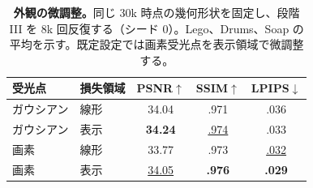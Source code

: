 \begin{table}[t]
\caption{\textbf{外観の微調整。}同じ 30k 時点の幾何形状を固定し、段階 III を 8k 回反復する（シード 0）。Lego、Drums、Soap の平均を示す。既定設定では画素受光点を表示領域で微調整する。}
\label{tab:refine}
\centering\small
\begin{tabular}{@{}llccc@{}}
\toprule
受光点 & 損失領域 & PSNR$\uparrow$ & SSIM$\uparrow$ & LPIPS$\downarrow$ \\
\midrule
ガウシアン & 線形 & 34.04 & .971 & .036 \\
ガウシアン & 表示 & \textbf{34.24} & \underline{.974} & .033 \\
画素 & 線形 & 33.77 & .973 & \underline{.032} \\
画素 & 表示 & \underline{34.05} & \textbf{.976} & \textbf{.029} \\
\bottomrule
\end{tabular}
\end{table}
